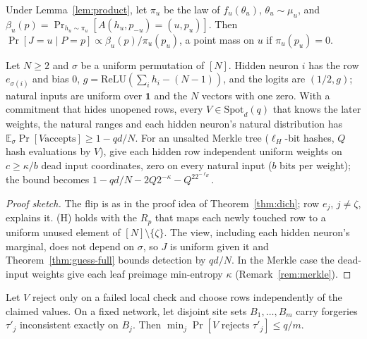 \begin{corollary}
\label{cor:surprise}
Under Lemma~\ref{lem:product}, let $\pi_u$ be the law of $f_u(\theta_u)$, $\theta_u\sim\mu_u$, and
$\beta_u(p)=\Pr_{h_u\sim\pi_u}[A(h_u,p_{-u})=(u,p_u)]$. Then $\Pr[J=u\mid P=p]\propto
\beta_u(p)/\pi_u(p_u)$, a point mass on $u$ if $\pi_u(p_u)=0$.
\end{corollary}

\begin{proposition}
\label{prop:worst}
Let $N\ge2$ and $\sigma$ be a uniform permutation of $[N]$. Hidden neuron $i$ has the row
$e_{\sigma(i)}$ and bias $0$, $g=\mathrm{ReLU}(\sum_ih_i-(N-1))$, and the logits are $(1/2,g)$;
natural inputs are uniform over $\mathbf 1$ and the $N$ vectors with one zero. With a commitment
that hides unopened rows, every $V\in\mathrm{Spot}_d(q)$ that knows the later weights, the natural
ranges and each hidden neuron's natural distribution has $\mathbb E_\sigma\Pr[V\text{
accepts}]\ge1-qd/N$. For an unsalted Merkle tree ($\ell_H$-bit hashes, $Q$ hash evaluations by
$V$), give each hidden row independent uniform weights on $c\ge\kappa/b$ dead input coordinates, zero on every
natural input ($b$ bits per weight); the bound becomes $1-qd/N-2Q2^{-\kappa}-Q^22^{-\ell_H}$.
\end{proposition}
\begin{proof}[Proof sketch]
The flip is as in the proof idea of Theorem~\ref{thm:dich}; row $e_j$, $j\neq\zeta$, explains
it. (H) holds with the $R_p$ that maps each newly touched row to a uniform unused element
of $[N]\setminus\{\zeta\}$. The view, including each hidden neuron's marginal, does not depend on
$\sigma$, so $J$ is uniform given it and Theorem~\ref{thm:guess-full} bounds detection by $qd/N$.
In the Merkle case the dead-input weights give each leaf preimage min-entropy $\kappa$
(Remark~\ref{rem:merkle}).
\end{proof}

\begin{proposition}
\label{prop:blind}
Let $V$ reject only on a failed local check and choose rows independently of the claimed values.
On a fixed network, let disjoint site sets $B_1,\dots,B_m$ carry forgeries $\tau'_j$ inconsistent
exactly on $B_j$. Then $\min_j\Pr[V\text{ rejects }\tau'_j]\le q/m$.
\end{proposition}

